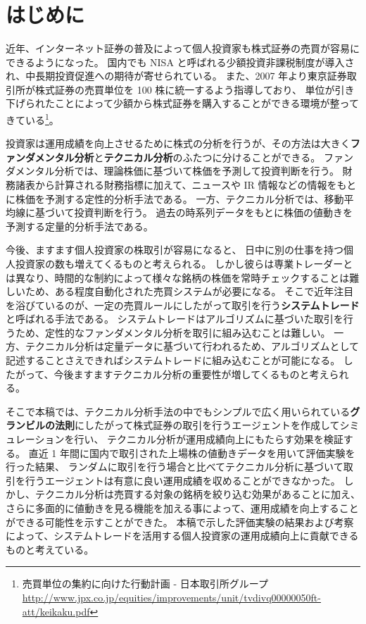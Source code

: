 \documentclass[twocolumn,jsaiac]{jarticle}
\title{
    \jtitle{テクニカル分析の有効性を検証する}
}
\author{
    \jname{37-147308 飯塚 修平}
}
\begin{document}
\maketitle
\section{はじめに}
近年、インターネット証券の普及によって個人投資家も株式証券の売買が容易にできるようになった。
国内でも NISA と呼ばれる少額投資非課税制度が導入され、中長期投資促進への期待が寄せられている\cite{nisa}。
また、2007 年より東京証券取引所が株式証券の売買単位を 100 株に統一するよう指導しており、
単位が引き下げられたことによって少額から株式証券を購入することができる環境が整ってきている\footnote{
  売買単位の集約に向けた行動計画 - 日本取引所グループ \url{http://www.jpx.co.jp/equities/improvements/unit/tvdivq00000050ft-att/keikaku.pdf}}。

投資家は運用成績を向上させるために株式の分析を行うが、その方法は大きく{\bf ファンダメンタル分析}と{\bf テクニカル分析}のふたつに分けることができる。
ファンダメンタル分析では、理論株価に基づいて株価を予測して投資判断を行う。
財務諸表から計算される財務指標に加えて、ニュースや IR 情報などの情報をもとに株価を予測する定性的分析手法である。
一方、テクニカル分析では、移動平均線に基づいて投資判断を行う。
過去の時系列データをもとに株価の値動きを予測する定量的分析手法である\cite{ga}。

今後、ますます個人投資家の株取引が容易になると、
日中に別の仕事を持つ個人投資家の数も増えてくるものと考えられる。
しかし彼らは専業トレーダーとは異なり、時間的な制約によって様々な銘柄の株価を常時チェックすることは難しいため、ある程度自動化された売買システムが必要になる。
そこで近年注目を浴びているのが、一定の売買ルールにしたがって取引を行う{\bf システムトレード}と呼ばれる手法である\cite{short}。
システムトレードはアルゴリズムに基づいた取引を行うため、定性的なファンダメンタル分析を取引に組み込むことは難しい。
一方、テクニカル分析は定量データに基づいて行われるため、アルゴリズムとして記述することさえできればシステムトレードに組み込むことが可能になる。
したがって、今後ますますテクニカル分析の重要性が増してくるものと考えられる。

そこで本稿では、テクニカル分析手法の中でもシンプルで広く用いられている{\bf グランビルの法則}にしたがって株式証券の取引を行うエージェントを作成してシミュレーションを行い、
テクニカル分析が運用成績向上にもたらす効果を検証する。
直近 1 年間に国内で取引された上場株の値動きデータを用いて評価実験を行った結果、
ランダムに取引を行う場合と比べてテクニカル分析に基づいて取引を行うエージェントは有意に良い運用成績を収めることができなかった。
しかし、テクニカル分析は売買する対象の銘柄を絞り込む効果があることに加え、さらに多面的に値動きを見る機能を加える事によって、運用成績を向上することができる可能性を示すことができた。
本稿で示した評価実験の結果および考察によって、システムトレードを活用する個人投資家の運用成績向上に貢献できるものと考えている。
\end{document}
